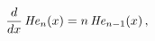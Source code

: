 \[\frac{d}{dx}\mathop{\mathit{He}_{n}\/}\nolimits\!\left(x\right)=n\mathop{%
\mathit{He}_{n-1}\/}\nolimits\!\left(x\right),\]